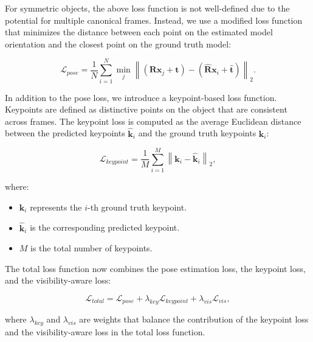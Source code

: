 \noindent For symmetric objects, the above loss function is not well-defined due to the potential for multiple canonical frames. Instead, we use a modified loss function that minimizes the distance between each point on the estimated model orientation and the closest point on the ground truth model:

\begin{equation}
\mathcal{L}_{pose} = \frac{1}{N} \sum_{i=1}^{N} \min_{j} \left\| (\mathbf{R} \mathbf{x}_j + \mathbf{t}) - (\hat{\mathbf{R}} \mathbf{x}_i + \hat{\mathbf{t}}) \right\|_2.
\end{equation}

\noindent In addition to the pose loss, we introduce a keypoint-based loss function. Keypoints are defined as distinctive points on the object that are consistent across frames. The keypoint loss is computed as the average Euclidean distance between the predicted keypoints $\hat{\mathbf{k}}_i$ and the ground truth keypoints $\mathbf{k}_i$:

\begin{equation}
\mathcal{L}_{keypoint} = \frac{1}{M} \sum_{i=1}^{M} \left\| \mathbf{k}_i - \hat{\mathbf{k}}_i \right\|_2,
\end{equation}

\noindent where:

\begin{itemize}
    \item $\mathbf{k}_i$ represents the $i$-th ground truth keypoint.
    \item $\hat{\mathbf{k}}_i$ is the corresponding predicted keypoint.
    \item $M$ is the total number of keypoints.
\end{itemize}

\noindent The total loss function now combines the pose estimation loss, the keypoint loss, and the visibility-aware loss:

\begin{equation}
\mathcal{L}_{total} = \mathcal{L}_{pose} + \lambda_{key} \mathcal{L}_{keypoint} + \lambda_{vis} \mathcal{L}_{vis},
\end{equation}

\noindent where $\lambda_{key}$ and $\lambda_{vis}$ are weights that balance the contribution of the keypoint loss and the visibility-aware loss in the total loss function.
